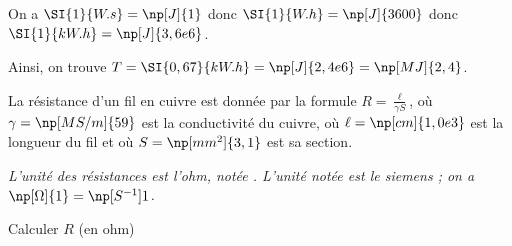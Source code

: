 
\begin{corrige}
On a $\SI{1}{W.s} = \np[J]{1}$ donc $\SI{1}{W.h} = \np[J]{3600}$  donc  $\SI{1}{kW.h} = \np[J]{3,6e6}$. 

Ainsi, on trouve $T = \SI{0,67}{kW.h} = \np[J]{2,4e6} = \np[MJ]{2,4}$.
\end{corrige}



\finEntrainement

\newpage



\hauteurLargeurCadreReponse		{8mm}{3cm}
\initialisationEntrainement

La résistance d'un fil en cuivre est donnée par la formule 
$R = \frac{\ell}{\gamma S}$,
où $\gamma = \np[MS/m]{59}$ est la conductivité du cuivre, où $\ell=\np[cm]{1,0e3}$ est la longueur du fil et où $S=\np[mm^2]{3,1}$ est sa section.

\smallskip

{\itshape L'unité des résistances est l'\emph{ohm}, notée \glm{$\Omega$}. L'unité notée  est le \emph{siemens} ; on a $\np[\Omega]{1} = \np[S^{-1}]{1}$.}


\debutEntrainement


\begin{enonce}
Calculer $R$ (en ohm)
\end{enonce}

